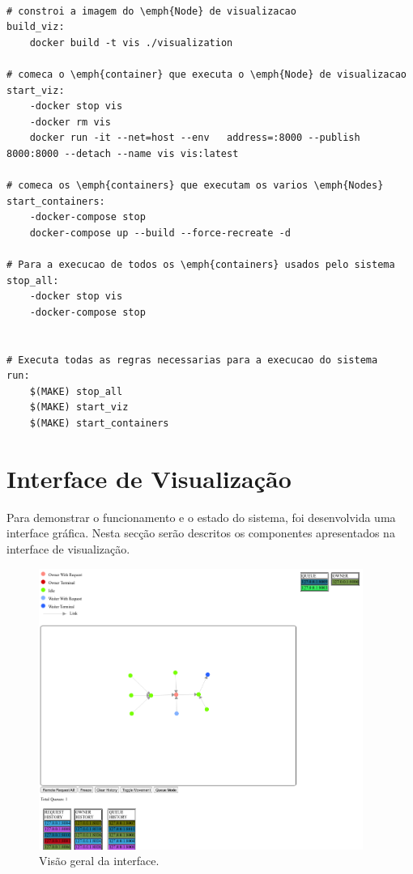 \begin{lstlisting}[caption={Ficheiro ``Makefile''}]

# constroi a imagem do \emph{Node} de visualizacao
build_viz:
	docker build -t vis ./visualization

# comeca o \emph{container} que executa o \emph{Node} de visualizacao
start_viz:
	-docker stop vis
	-docker rm vis
	docker run -it --net=host --env   address=:8000 --publish 8000:8000 --detach --name vis vis:latest

# comeca os \emph{containers} que executam os varios \emph{Nodes}
start_containers:
	-docker-compose stop
	docker-compose up --build --force-recreate -d

# Para a execucao de todos os \emph{containers} usados pelo sistema
stop_all:
	-docker stop vis
	-docker-compose stop


# Executa todas as regras necessarias para a execucao do sistema
run:
	$(MAKE) stop_all
	$(MAKE) start_viz
	$(MAKE) start_containers
\end{lstlisting}


\section{Interface de Visualização}
\label{validacao:sec:interface}
Para demonstrar o funcionamento e o estado do sistema, foi desenvolvida uma interface gráfica. Nesta secção serão descritos os componentes apresentados na interface de visualização.

\begin{figure}[!htb]
\centering
\includegraphics[width=300pt]{relatorio_overview.png}
\caption{Visão geral da interface.}
\end{figure}

